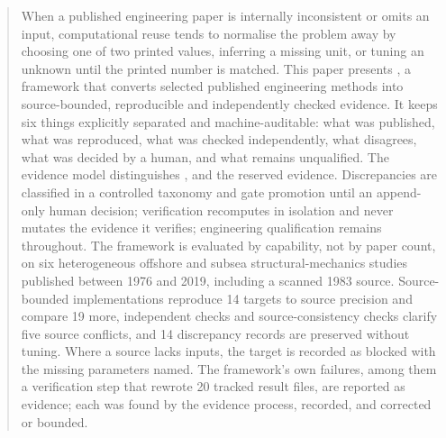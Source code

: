 \begin{abstract}
When a published engineering paper is internally inconsistent or omits an input, computational reuse tends to normalise the problem away by choosing one of two printed values, inferring a missing unit, or tuning an unknown until the printed number is matched. This paper presents \engiproof, a framework that converts selected published engineering methods into source-bounded, reproducible and independently checked evidence. It keeps six things explicitly separated and machine-auditable: what was published, what was reproduced, what was checked independently, what disagrees, what was decided by a human, and what remains unqualified. The evidence model distinguishes ,  and the reserved  evidence. Discrepancies are classified in a controlled taxonomy and gate promotion until an append-only human decision; verification recomputes in isolation and never mutates the evidence it verifies; engineering qualification remains  throughout. The framework is evaluated by capability, not by paper count, on six heterogeneous offshore and subsea structural-mechanics studies published between 1976 and 2019, including a scanned 1983 source. Source-bounded implementations reproduce 14 targets to source precision and compare 19 more, independent checks and source-consistency checks clarify five source conflicts, and 14 discrepancy records are preserved without tuning. Where a source lacks inputs, the target is recorded as blocked with the missing parameters named. The framework's own failures, among them a verification step that rewrote 20 tracked result files, are reported as evidence; each was found by the evidence process, recorded, and corrected or bounded.
\end{abstract}
